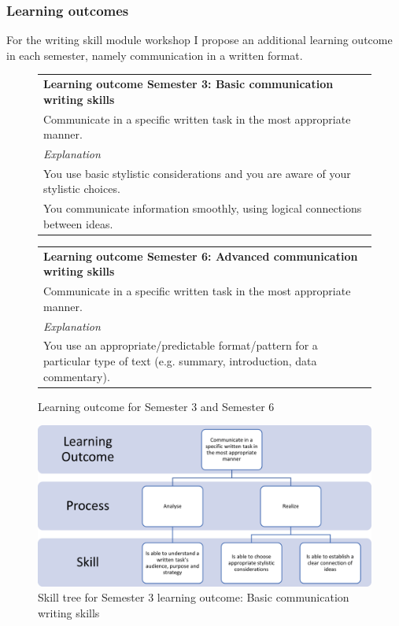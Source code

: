 \subsubsection{Learning outcomes}
For the writing skill module workshop I propose an additional learning outcome in each semester, namely communication in a written format.

\begin{figure}[h!]
\begin{tabular}{|p{\textwidth}|}
 \hline
    \textbf{Learning outcome Semester 3: Basic communication writing skills}\\
    Communicate in a specific written task in the most appropriate manner.\\
 \hline
    \textit{Explanation}\\
    You use basic stylistic considerations and you are aware of your stylistic choices.
    \\ 
    You communicate information smoothly, using logical connections between ideas.\\
 \hline
\end{tabular}

\begin{tabular}{|p{\textwidth}|}
 \hline
    \textbf{Learning outcome Semester 6: Advanced communication writing skills}\\
    Communicate in a specific written task in the most appropriate manner.\\
 \hline
    \textit{Explanation}\\
    You use an appropriate/predictable format/pattern for a particular type of text (e.g. summary, introduction, data commentary).
    \\ 
 \hline
\end{tabular}
  \caption{Learning outcome for Semester 3 and Semester 6}
\end{figure}

\begin{figure}[h!]
    \centering
   \includegraphics[width=\textwidth]{appendices/learning_outcomes/LO_S3.png}
    \caption{Skill tree for Semester 3 learning outcome: Basic communication writing skills}
    \label{fig:LO_S3}
\end{figure}

